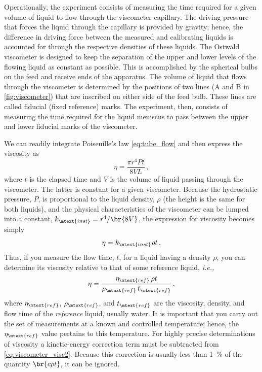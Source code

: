 \documentclass[nobib,nofonts,nols,nohyper]{tufte-handout}
\begin{document}
Operationally, the experiment consists of measuring the time required for a given volume of liquid to flow through the viscometer capillary. 
The driving pressure that forces the liquid through the capillary is provided by gravity; hence, the difference in driving force between the measured and calibrating liquids is accounted for through the respective densities of these liquids. 
The Ostwald viscometer is designed to keep the separation of the upper and lower levels of the flowing liquid as constant as possible. 
This is accomplished by the spherical bulbs on the feed and receive ends of the apparatus. 
The volume of liquid that flows through the viscometer is determined by the positions of two lines (A and B in \cref{fig:viscometer}) that are inscribed on either side of the feed bulb. 
These lines are called fiducial (fixed reference) marks. 
The experiment, then, consists of measuring the time required for the liquid meniscus to pass between the upper and lower fiducial marks of the viscometer.

We can readily integrate Poiseuille's law \cref{eq:tube_flow} and then express the viscosity as
\begin{equation}
	\eta = \frac{\pi r^4 P t}{8 V L} \, ,
	\label{eq:viscometer_visc1}
\end{equation}
where \( t \) is the elapsed time and \( V \) is the volume of liquid passing through the viscometer. 
The latter is constant for a given viscometer. 
Because the hydrostatic pressure, \( P \), is proportional to the liquid density, \( \rho \) (the height is the same for both liquids), and the physical characteristics of the viscometer can be lumped into a constant, \( k_\mtext{inst} = r^4/\br{8 V} \), the expression for viscosity becomes simply
\begin{equation}
	\eta = k_\mtext{inst} \rho t \, .
	\label{eq:viscometer_visc2}
\end{equation}
Thus, if you measure the flow time, \( t \), for a liquid having a density \( \rho \), you can determine its viscosity relative to that of some reference liquid, \emph{i.e.,}
\begin{equation}
	\eta = \frac{\eta_\mtext{ref} \, \rho t}{\rho_\mtext{ref} \, t_\mtext{ref}} \, ,
	\label{eq:ref_viscosity}
\end{equation}
where \( \eta_\mtext{ref} \), \( \rho_\mtext{ref} \), and \( t_\mtext{ref} \) are the viscosity, density, and flow time of the \emph{reference} liquid, usually water. 
It is important that you carry out the set of measurements at a known and controlled temperature; hence, the \( \eta_\mtext{ref} \) value pertains to this temperature. 
For highly precise determinations of viscosity a kinetic-energy correction term must be subtracted from \cref{eq:viscometer_visc2}. 
Because this correction is usually less than \SI{1}{\percent} of the quantity \( \br{c \rho t} \), it can be ignored.
\end{document}
